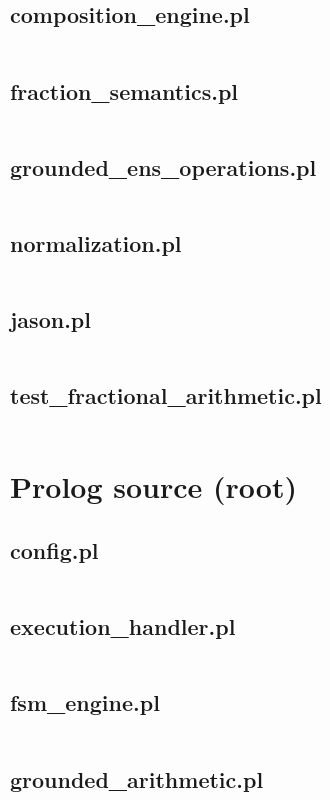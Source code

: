 \documentclass{article}
\begin{document}
\subsection{composition\_engine.pl}
\inputminted{prolog}{composition_engine.pl}
\subsection{fraction\_semantics.pl}
\inputminted{prolog}{fraction_semantics.pl}
\subsection{grounded\_ens\_operations.pl}
\inputminted{prolog}{grounded_ens_operations.pl}
\subsection{normalization.pl}
\inputminted{prolog}{normalization.pl}
\subsection{jason.pl}
\inputminted{prolog}{jason.pl}
\subsection{test\_fractional\_arithmetic.pl}
\inputminted{prolog}{test_fractional_arithmetic.pl}

\section{Prolog source (root)}
\subsection{config.pl}
\inputminted{prolog}{config.pl}
\subsection{execution\_handler.pl}
\inputminted{prolog}{execution_handler.pl}
\subsection{fsm\_engine.pl}
\inputminted{prolog}{fsm_engine.pl}
\subsection{grounded\_arithmetic.pl}
\inputminted{prolog}{grounded_arithmetic.pl}
\end{document}
